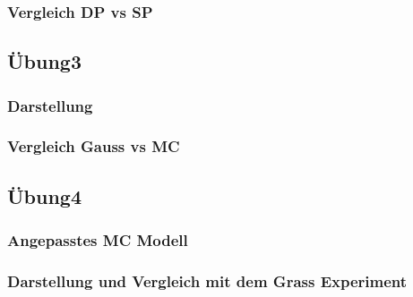 \documentclass[ngerman]{scrartcl}
\begin{document}
\subsubsection{Vergleich DP vs SP}
%
\subsection{Übung3}
\subsubsection{Darstellung}
%
\subsubsection{Vergleich Gauss vs MC}
%
\subsection{Übung4}
\subsubsection{Angepasstes MC Modell}
%
\subsubsection{Darstellung und Vergleich mit dem Grass Experiment}
%
\end{document}
